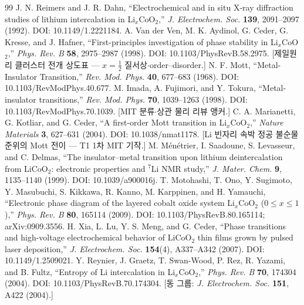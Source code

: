 \begin{thebibliography}{99}
 J. N. Reimers and J. R. Dahn, ``Electrochemical and in situ X-ray diffraction studies of lithium intercalation in Li$_x$CoO$_2$,'' \emph{J. Electrochem. Soc.} \textbf{139}, 2091--2097 (1992). DOI: 10.1149/1.2221184.
 A. Van der Ven, M. K. Aydinol, G. Ceder, G. Kresse, and J. Hafner, ``First-principles investigation of phase stability in Li$_x$CoO$_2$,'' \emph{Phys. Rev. B} \textbf{58}, 2975--2987 (1998). DOI: 10.1103/PhysRevB.58.2975. [제일원리 클러스터 전개 상도표 --- $x{=}\tfrac12$ 질서상$\cdot$order--disorder.]
 N. F. Mott, ``Metal-Insulator Transition,'' \emph{Rev. Mod. Phys.} \textbf{40}, 677--683 (1968). DOI: 10.1103/RevModPhys.40.677.
 M. Imada, A. Fujimori, and Y. Tokura, ``Metal-insulator transitions,'' \emph{Rev. Mod. Phys.} \textbf{70}, 1039--1263 (1998). DOI: 10.1103/RevModPhys.70.1039. [MIT 분류$\cdot$상관 물리 리뷰 앵커.]
 C. A. Marianetti, G. Kotliar, and G. Ceder, ``A first-order Mott transition in Li$_x$CoO$_2$,'' \emph{Nature Materials} \textbf{3}, 627--631 (2004). DOI: 10.1038/nmat1178. [Li 빈자리 속박 정공 불순물 준위의 Mott 전이 --- T1 1차 MIT 기작.]
 M. M\'en\'etrier, I. Saadoune, S. Levasseur, and C. Delmas, ``The insulator--metal transition upon lithium deintercalation from LiCoO$_2$: electronic properties and $^7$Li NMR study,'' \emph{J. Mater. Chem.} \textbf{9}, 1135--1140 (1999). DOI: 10.1039/a900016j.
 T. Motohashi, T. Ono, Y. Sugimoto, Y. Masubuchi, S. Kikkawa, R. Kanno, M. Karppinen, and H. Yamauchi, ``Electronic phase diagram of the layered cobalt oxide system Li$_x$CoO$_2$ ($0\le x\le1$),'' \emph{Phys. Rev. B} \textbf{80}, 165114 (2009). DOI: 10.1103/PhysRevB.80.165114; arXiv:0909.3556.
 H. Xia, L. Lu, Y. S. Meng, and G. Ceder, ``Phase transitions and high-voltage electrochemical behavior of LiCoO$_2$ thin films grown by pulsed laser deposition,'' \emph{J. Electrochem. Soc.} \textbf{154}(4), A337--A342 (2007). DOI: 10.1149/1.2509021.
 Y. Reynier, J. Graetz, T. Swan-Wood, P. Rez, R. Yazami, and B. Fultz, ``Entropy of Li intercalation in Li$_x$CoO$_2$,'' \emph{Phys. Rev. B} \textbf{70}, 174304 (2004). DOI: 10.1103/PhysRevB.70.174304. [동 그룹: \emph{J. Electrochem. Soc.} \textbf{151}, A422 (2004).]

\end{thebibliography}
